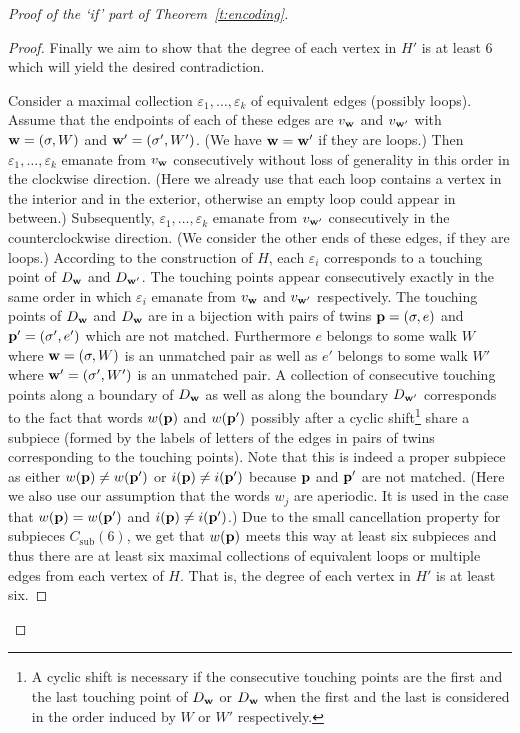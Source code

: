 \documentclass[10pt,a4paper]{article}
\theoremstyle{definition}
\theoremstyle{remark}
\newcommand\makevec[1]{{\bf #1}}
\def \pp {\makevec{p}}
\def \ww {\makevec{w}}
\DeclareMathOperator{\sub}{sub}
\begin{document}
\begin{proof}[Proof of the `if' part of Theorem~\ref{t:encoding}]
\begin{proof}
Finally we aim to show that the degree of each vertex in $H'$ is at least $6$
which will yield the desired contradiction.



Consider a maximal collection $\varepsilon_1, \dots, \varepsilon_k$ of equivalent
edges (possibly loops). 
Assume that the endpoints of each of these edges
are $v_{\ww}$ and $v_{\ww'}$ with $\ww = (\sigma, W)$ and $\ww' = (\sigma',
W')$. (We have $\ww = \ww'$ if they are loops.) Then
$\varepsilon_1, \dots, \varepsilon_k$ emanate from $v_\ww$ consecutively without loss of generality
in this order in the clockwise direction. (Here we already use that
each loop contains a vertex in the interior and in the exterior, otherwise an
empty loop could appear in between.) Subsequently, $\varepsilon_1, \dots,
\varepsilon_k$ emanate
from $v_{\ww'}$ consecutively in the counterclockwise direction. (We consider
the other ends of these edges, if they are loops.) According to the
construction of $H$, each $\varepsilon_i$ corresponds to a touching point of
$D_\ww$ and $D_{\ww'}$. The touching points appear consecutively exactly in the same order in
which $\varepsilon_i$ emanate from $v_\ww$ and $v_{\ww'}$ respectively.
The touching points of $D_{\ww}$ and $D_{\ww}$ are in a bijection with pairs of
  twins $\pp = (\sigma, e)$ and $\pp' = (\sigma',e')$ which are not matched.
  Furthermore $e$ belongs to some walk $W$ where $\ww = (\sigma, W)$ is an
  unmatched pair as well as $e'$ belongs to some walk $W'$ where $\ww' =
  (\sigma', W')$ is an unmatched pair. A collection of consecutive touching
  points along a boundary of $D_{\ww}$ as well as along the boundary $D_{\ww'}$
  corresponds to the fact that words $w(\pp)$ and $w(\pp')$ possibly
  after a cyclic shift\footnote{A cyclic shift is necessary if the consecutive
  touching points are the first and the last touching point of $D_\ww$ or
  $D_{\ww}$ when the first and the last is considered in the order induced by
  $W$ or $W'$ respectively.} share a subpiece
  (formed by the labels of letters of the edges in pairs of twins corresponding
  to the touching points). Note that this is indeed a proper subpiece as either
  $w(\pp) \neq w(\pp')$ or $i(\pp) \neq i(\pp')$ because $\pp$ and $\pp'$ are
  not matched. (Here we also use our assumption that the words $w_j$ are
  aperiodic. It is used in the case that $w(\pp) = w(\pp')$ and $i(\pp) \neq
  i(\pp')$.) Due to the small cancellation property for subpieces $C_{\sub}(6)$, we get that
  $w(\pp)$ meets this way at least six subpieces and thus
  there
  are at least six maximal collections of equivalent loops or multiple edges
  from each vertex of $H$. That is, the degree of each vertex in $H'$ is at
  least six.


\end{proof}
\end{proof}
\end{document}
